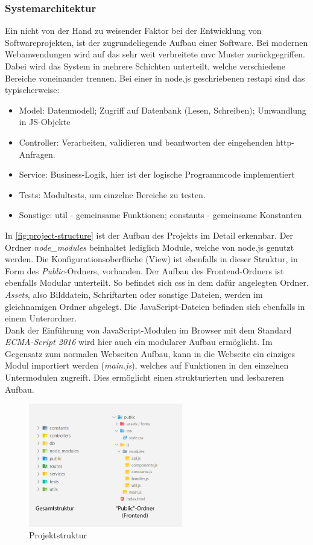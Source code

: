 \subsubsection{Systemarchitektur} \label{subsub:system-architectuere}
Ein nicht von der Hand zu weisender Faktor bei der Entwicklung von Softwareprojekten, ist der zugrundeliegende Aufbau einer Software. Bei modernen Webanwendungen wird auf das sehr weit verbreitete \gls{mvc} Muster zurückgegriffen. Dabei wird das System in mehrere Schichten unterteilt, welche verschiedene Bereiche voneinander trennen. Bei einer in node.js geschriebenen \gls{restapi} sind das typischerweise:
\begin{itemize}
    \item Model: Datenmodell; Zugriff auf Datenbank (Lesen, Schreiben); Umwandlung in JS-Objekte
    \item Controller: Verarbeiten, validieren und beantworten der eingehenden \gls{http}-Anfragen.
    \item  Service: Business-Logik, hier ist der logische Programmcode implementiert
    \item Tests: Modultests, um einzelne Bereiche zu testen. 
    \item Sonstige: util - gemeinsame Funktionen; constants - gemeinsame Konstanten
\end{itemize}
In \autoref{fig:project-structure} ist der Aufbau des Projekts im Detail erkennbar. Der Ordner \textit{node{\_}modules} beinhaltet lediglich Module, welche von node.js genutzt werden. 
Die Konfigurationsoberfläche (View) ist ebenfalls in dieser Struktur, in Form des \textit{Public}-Ordners, vorhanden. Der Aufbau des Frontend-Ordners ist ebenfalls Modular unterteilt. So befindet sich \gls{css} in dem dafür angelegten Ordner. \textit{Assets}, also Bilddatein, Schriftarten oder sonstige Dateien, werden im gleichnamigen Ordner abgelegt. Die JavaScript-Dateien befinden sich ebenfalls in einem Unterordner. \\
Dank der Einführung von JavaScript-Modulen im Browser mit dem Standard \textit{ECMA-Script 2016} wird hier auch ein modularer Aufbau ermöglicht. Im Gegensatz zum normalen Webseiten Aufbau, kann in die Webseite ein einziges Modul importiert werden (\textit{main.js}), welches auf Funktionen in den einzelnen Untermodulen zugreift. Dies ermöglicht einen strukturierten und lesbareren Aufbau. \cite{Mozilla.2020}

\begin{figure}[h]
    \centering
    \includegraphics[width=0.6\textwidth]{figures/ordner-strukturen.png}
    \caption{Projektstruktur}
    \label{fig:project-structure}
\end{figure}
